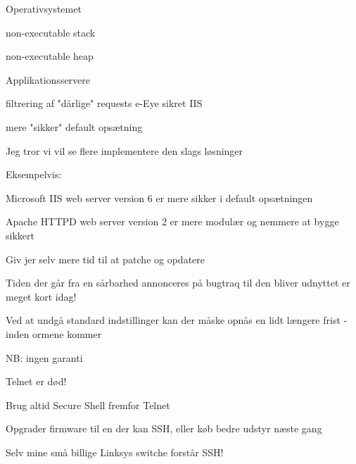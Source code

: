 \documentclass[Screen16to9,17pt]{foils}
\begin{document}
\begin{list1}
\item Operativsystemet
  \begin{list2}
  \item non-executable stack
  \item non-executable heap
  \end{list2}
\item Applikationsservere
  \begin{list2}
  \item filtrering af "dårlige" requests e-Eye sikret IIS
  \item mere "sikker" default opsætning
  \end{list2}
\item Jeg tror vi vil se flere implementere den slags løsninger
\item Eksempelvis:
\begin{list2}
\item Microsoft IIS web server version 6 er mere sikker i default opsætningen
\item Apache HTTPD web server version 2 er mere modulær og nemmere at bygge sikkert
\end{list2}
\end{list1}


\begin{list1}
\item Giv jer selv mere tid til at patche og opdatere
\item Tiden der går fra en sårbarhed annonceres på bugtraq til den bliver
       udnyttet er meget kort idag!
\item Ved at undgå standard indstillinger kan der
       måske opnås en lidt længere frist - inden ormene kommer
\item NB: ingen garanti
\end{list1}




\begin{list1}
\item Telnet er død!
\item Brug altid Secure Shell fremfor Telnet
\item Opgrader firmware til en der kan SSH, eller køb bedre udstyr næste gang
\item Selv mine små billige Linksys switche forstår SSH!
\end{list1}
\end{document}
